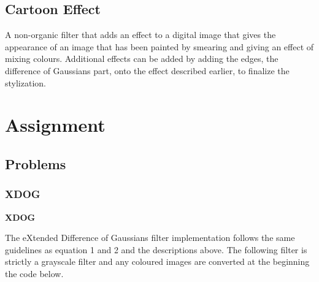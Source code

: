 \documentclass{article}
\begin{document}
	\subsection{Cartoon Effect}
	
	A non-organic filter that adds an effect to a digital image that gives the appearance of an image that has been painted by smearing and giving an effect of mixing colours. Additional effects can be added by adding the edges, the difference of Gaussians part, onto the effect described earlier, to finalize the stylization.
	
	\section{Assignment}
	
	\subsection{Problems}
	
	\subsubsection{XDOG}
	
	\smallskip
	
	\textbf{XDOG}
	
	The eXtended Difference of Gaussians filter implementation follows the same guidelines as equation 1 and 2 and the descriptions above. The following filter is strictly a grayscale filter and any coloured images are converted at the beginning the code below.\\
		
\end{document}
